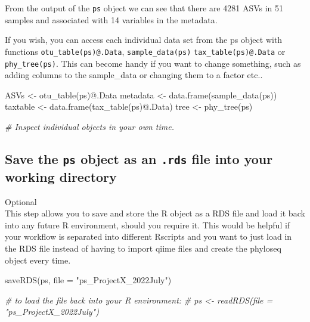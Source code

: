\documentclass[
]{book}
\newenvironment{Shaded}{\begin{snugshade}}{\end{snugshade}}
\newcommand{\AttributeTok}[1]{\textcolor[rgb]{0.77,0.63,0.00}{#1}}
\newcommand{\CommentTok}[1]{\textcolor[rgb]{0.56,0.35,0.01}{\textit{#1}}}
\newcommand{\FunctionTok}[1]{\textcolor[rgb]{0.00,0.00,0.00}{#1}}
\newcommand{\NormalTok}[1]{#1}
\newcommand{\OtherTok}[1]{\textcolor[rgb]{0.56,0.35,0.01}{#1}}
\newcommand{\SpecialCharTok}[1]{\textcolor[rgb]{0.00,0.00,0.00}{#1}}
\newcommand{\StringTok}[1]{\textcolor[rgb]{0.31,0.60,0.02}{#1}}
\begin{document}
From the output of the \texttt{ps} object we can see that there are 4281 ASVs in 51 samples and associated with 14 variables in the metadata.

If you wish, you can access each individual data set from the ps object with functions \texttt{otu\_table(ps)@.Data}, \texttt{sample\_data(ps)} \texttt{tax\_table(ps)@.Data} or \texttt{phy\_tree(ps)}. This can become handy if you want to change something, such as adding columns to the sample\_data or changing them to a factor etc..

\begin{Shaded}
\begin{Highlighting}[]
\NormalTok{ASVs }\OtherTok{\textless{}{-}} \FunctionTok{otu\_table}\NormalTok{(ps)}\SpecialCharTok{@}\NormalTok{.Data}
\NormalTok{metadata }\OtherTok{\textless{}{-}} \FunctionTok{data.frame}\NormalTok{(}\FunctionTok{sample\_data}\NormalTok{(ps))}
\NormalTok{taxtable }\OtherTok{\textless{}{-}} \FunctionTok{data.frame}\NormalTok{(}\FunctionTok{tax\_table}\NormalTok{(ps)}\SpecialCharTok{@}\NormalTok{.Data)}
\NormalTok{tree }\OtherTok{\textless{}{-}} \FunctionTok{phy\_tree}\NormalTok{(ps)}

\CommentTok{\# Inspect individual objects in your own time. }
\end{Highlighting}
\end{Shaded}

\hfill\break

\hypertarget{save-the-ps-object-as-an-.rds-file-into-your-working-directory}{%
\subsection{\texorpdfstring{Save the \texttt{ps} object as an \texttt{.rds} file into your working directory}{Save the ps object as an .rds file into your working directory}}\label{save-the-ps-object-as-an-.rds-file-into-your-working-directory}}

Optional\\
This step allows you to save and store the R object as a RDS file and load it back into any future R environment, should you require it. This would be helpful if your workflow is separated into different Rscripts and you want to just load in the RDS file instead of having to import qiime files and create the phyloseq object every time.

\begin{Shaded}
\begin{Highlighting}[]
\FunctionTok{saveRDS}\NormalTok{(ps, }\AttributeTok{file =} \StringTok{"ps\_ProjectX\_2022July"}\NormalTok{)}

\CommentTok{\# to load the file back into your R environment:}
\CommentTok{\# ps \textless{}{-} readRDS(file = "ps\_ProjectX\_2022July")}
\end{Highlighting}
\end{Shaded}
\end{document}
